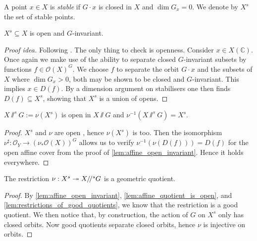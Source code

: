 \documentclass[12pt]{ociamthesis}  %
\begin{document}
\begin{definition}\label{def:affine_stability}
  A point $x\in X$ is \emph{stable} if $G\cdot x$ is closed in $X$
  and $\dim G_x = 0$. We denote by $X^s$ the set of stable
  points.
\end{definition}

\begin{lemma}\label{lem:affine_open_invariant}
  $X^s \subseteq X$ is open and $G$-invariant.
  \begin{proof}[Proof idea]
    Following \cite[Proposition 4.36]{hoskins2016}.
    The only thing to check is openness.
    Consider $x\in X(\mathbb C)$.  Once again we make use of the
    ability to separate closed $G$-invariant subsets by functions
    $f \in \mathscr O(X)^G$. \cite[Lemma 4.29]{hoskins2016}
    We choose $f$ to separate the orbit $G\cdot x$ and the
    subsets of $X$ where $\dim G_x > 0$, both may be shown to
    be closed and $G$-invariant. This implies $x\in D(f)$.
    By a dimension argument on stabilisers one then finds
    $D(f)\subseteq X^s$, showing that $X^s$ is a union of opens.
  \end{proof}
\end{lemma}

\begin{lemma}\label{lem:affine_quotient_is_open}
  $X\sslash^s G := \nu(X^s)$ is open in $X\sslash G$ and
  $\nu^{-1}(X\sslash^s G) = X^s$.
  \begin{proof}
    $X^s$ and $\nu$ are open , hence $\nu(X^s)$ is too.
    Then the isomorphism $\nu^\sharp : \mathscr O_Y \to (\nu_*\mathscr O(X))^G$
    allows us to verify $\nu^{-1}(\nu(D(f))) = D(f)$ for the open
    affine cover from the proof of \ref{lem:affine_open_invariant}.
    Hence it holds everywhere.
  \end{proof}
\end{lemma}

\begin{theorem}\label{thm:affine_quotient_is_geometric}
  The restriction $\nu : X^s \twoheadrightarrow X/\!/^s G$ is a geometric quotient.
  \begin{proof}
    By \ref{lem:affine_open_invariant}, \ref{lem:affine_quotient_is_open},
    and \ref{lem:restrictions_of_good_quotients}, we know that
    the restriction is a good quotient. We then notice that, by construction,
    the action of $G$ on $X^s$ only has closed orbits. Now good
    quotients separate closed orbits, hence $\nu$ is injective on orbits.
  \end{proof}
\end{theorem}
\end{document}
